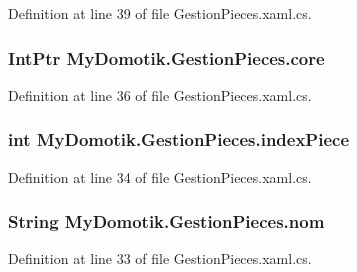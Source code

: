 Definition at line 39 of file Gestion\+Pieces.\+xaml.\+cs.

\subsubsection[{\texorpdfstring{core}{core}}]{\setlength{\rightskip}{0pt plus 5cm}Int\+Ptr My\+Domotik.\+Gestion\+Pieces.\+core\hspace{0.3cm}{\ttfamily [private]}}\hypertarget{class_my_domotik_1_1_gestion_pieces_ac0413c01cf25731dce9798e61902127f}{}\label{class_my_domotik_1_1_gestion_pieces_ac0413c01cf25731dce9798e61902127f}


Definition at line 36 of file Gestion\+Pieces.\+xaml.\+cs.

\subsubsection[{\texorpdfstring{index\+Piece}{indexPiece}}]{\setlength{\rightskip}{0pt plus 5cm}int My\+Domotik.\+Gestion\+Pieces.\+index\+Piece\hspace{0.3cm}{\ttfamily [private]}}\hypertarget{class_my_domotik_1_1_gestion_pieces_a3081b3a9bd790362ccede15eea02219e}{}\label{class_my_domotik_1_1_gestion_pieces_a3081b3a9bd790362ccede15eea02219e}


Definition at line 34 of file Gestion\+Pieces.\+xaml.\+cs.

\subsubsection[{\texorpdfstring{nom}{nom}}]{\setlength{\rightskip}{0pt plus 5cm}String My\+Domotik.\+Gestion\+Pieces.\+nom\hspace{0.3cm}{\ttfamily [private]}}\hypertarget{class_my_domotik_1_1_gestion_pieces_ac20f326e4fe968c5b11c113c54410d43}{}\label{class_my_domotik_1_1_gestion_pieces_ac20f326e4fe968c5b11c113c54410d43}


Definition at line 33 of file Gestion\+Pieces.\+xaml.\+cs.

